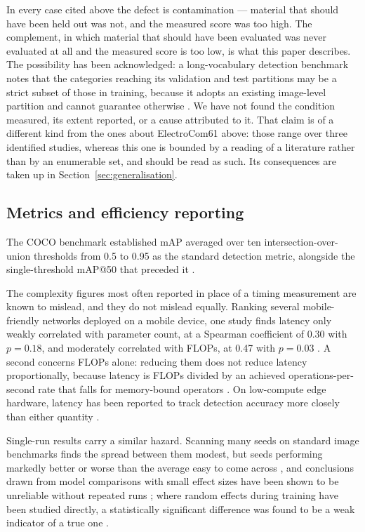 In every case cited above the defect is contamination --- material that should
have been held out was not, and the measured score was too high. The complement,
in which material that should have been evaluated was never evaluated at all and
the measured score is too low, is what this paper describes. The possibility has
been acknowledged: a long-vocabulary detection benchmark notes that the
categories reaching its validation and test partitions may be a strict subset of
those in training, because it adopts an existing image-level partition and cannot
guarantee otherwise \citep{gupta2019lvis}. We have not found the condition
measured, its extent reported, or a cause attributed to it. That claim is of a
different kind from the ones about ElectroCom61 above: those range over three
identified studies, whereas this one is bounded by a reading of a literature
rather than by an enumerable set, and should be read as
such. Its consequences are taken up in
Section~\ref{sec:generalisation}.

\subsection{Metrics and efficiency reporting}
\label{sec:related-metrics}

The COCO benchmark established mAP averaged over ten intersection-over-union
thresholds from 0.5 to 0.95 as the standard detection metric, alongside the
single-threshold mAP@50 that preceded it \citep{coco}.

The complexity figures most often reported in place of a timing measurement are
known to mislead, and they do not mislead equally. Ranking several
mobile-friendly networks deployed on a mobile device, one study finds latency
only weakly correlated with parameter count, at a Spearman coefficient of 0.30
with $p = 0.18$, and moderately correlated with FLOPs, at 0.47 with $p = 0.03$
\citep{vasu2023mobileone}. A second concerns FLOPs alone: reducing them does not
reduce latency proportionally, because latency is FLOPs divided by an achieved
operations-per-second rate that falls for memory-bound operators
\citep{chen2023run}. On low-compute edge hardware, latency has been reported to
track detection accuracy more closely than either quantity \citep{kong2026edge}.

Single-run results carry a similar hazard. Scanning many seeds on standard image
benchmarks finds the spread between them modest, but seeds performing markedly
better or worse than the average easy to come across \citep{picard2021seed}, and
conclusions drawn from model comparisons with small effect sizes have been shown
to be unreliable without repeated runs \citep{gundersen2023reporting}; where
random effects during training have been studied directly, a statistically
significant difference was found to be a weak indicator of a true one
\citep{akesson2024random}.

